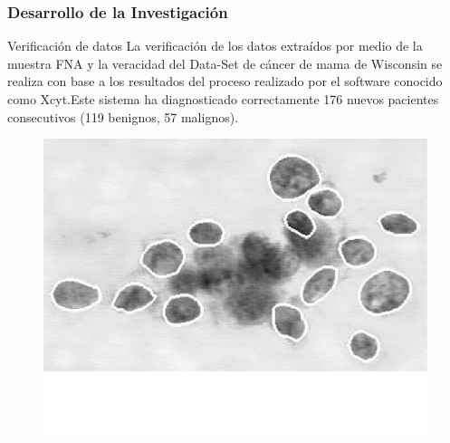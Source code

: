 \documentclass[xcolor=dvipsnames,xcolor=table]{beamer} %
\begin{document}
\begin{frame}
	\frametitle{Desarrollo de la Investigación}
	\begin{block}{Verificación de datos}\justifying
		La verificación de los datos extraídos por medio de la muestra FNA y la veracidad del Data-Set  de cáncer de mama de Wisconsin se realiza con base a los resultados  del proceso realizado por el software conocido como Xcyt.Este sistema ha diagnosticado correctamente 176 nuevos pacientes consecutivos (119 benignos, 57 malignos)\cite{b3}.
	\end{block}
	\begin{figure}[h!]
		\centering
		\includegraphics[width=0.5\linewidth]{PROYECTO/imgs/fna}
	\end{figure}
\end{frame}
\end{document}
